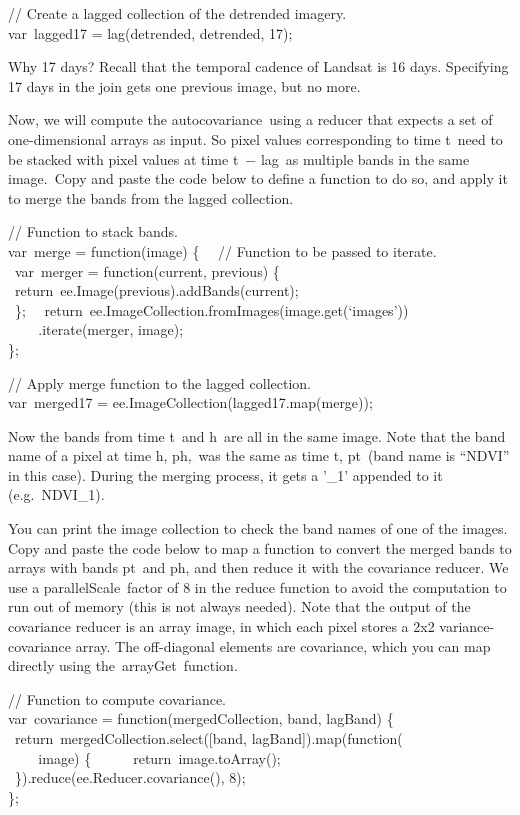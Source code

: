 \documentclass[
  letterpaper,
  DIV=11,
  numbers=noendperiod]{scrreprt}
\begin{document}
// Create a lagged collection of the detrended imagery.\\
var~lagged17 = lag(detrended, detrended, 17);

Why 17 days? Recall that the temporal cadence of Landsat is 16 days.
Specifying 17 days in the join gets one previous image, but no more.

Now, we will compute the autocovariance~using a reducer that expects a
set of one-dimensional arrays as input. So pixel values corresponding to
time t~need to be stacked with pixel values at time t~− lag~as multiple
bands in the same image.~Copy and paste the code below to define a
function to do so, and apply it to merge the bands from the lagged
collection.

// Function to stack bands.\\
var~merge = function(image) \{~ ~// Function to be passed to iterate.~
~var~merger = function(current, previous) \{~ ~ ~
~return~ee.Image(previous).addBands(current);\\
\hspace*{0.333em} ~\};~
~return~ee.ImageCollection.fromImages(image.get(`images'))\\
\hspace*{0.333em} ~ ~ ~.iterate(merger, image);\\
\};

// Apply merge function to the lagged collection.\\
var~merged17 = ee.ImageCollection(lagged17.map(merge));

Now the bands from time t~and h~are all in the same image. Note that the
band name of a pixel at time h, ph,~was the same as time t, pt~(band
name is ``NDVI'' in this case). During the merging process, it gets a
'\_1' appended to it (e.g.~NDVI\_1).

You can print the image collection to check the band names of one of the
images. Copy and paste the code below to map a function to convert the
merged bands to arrays with bands pt~and ph, and then reduce it with the
covariance reducer. We use a parallelScale~factor of 8 in the reduce
function to avoid the computation to run out of memory (this is not
always needed). Note that the output of the covariance reducer is an
array image, in which each pixel stores a 2x2 variance-covariance array.
The off-diagonal elements are covariance, which you can map directly
using the~arrayGet~function.

// Function to compute covariance.\\
var~covariance = function(mergedCollection, band, lagBand) \{~
~return~mergedCollection.select({[}band, lagBand{]}).map(function(\\
\hspace*{0.333em} ~ ~ ~image) \{~ ~ ~ ~return~image.toArray();\\
\hspace*{0.333em} ~\}).reduce(ee.Reducer.covariance(), 8);\\
\};
\end{document}
